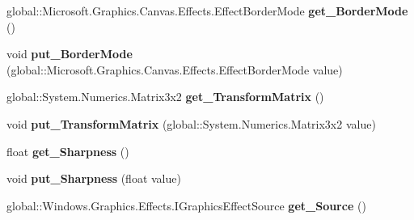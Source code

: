 \begin{DoxyCompactItemize}
global\+::\+Microsoft.\+Graphics.\+Canvas.\+Effects.\+Effect\+Border\+Mode {\bfseries get\+\_\+\+Border\+Mode} ()
\item 
\mbox{\label{interface_microsoft_1_1_graphics_1_1_canvas_1_1_effects_1_1_i_transform2_d_effect_a38434702873fe7cbe1f7303fd42c85de}} 
void {\bfseries put\+\_\+\+Border\+Mode} (global\+::\+Microsoft.\+Graphics.\+Canvas.\+Effects.\+Effect\+Border\+Mode value)
\item 
\mbox{\label{interface_microsoft_1_1_graphics_1_1_canvas_1_1_effects_1_1_i_transform2_d_effect_ac948729dfbfa255235037cd2b8a44715}} 
global\+::\+System.\+Numerics.\+Matrix3x2 {\bfseries get\+\_\+\+Transform\+Matrix} ()
\item 
\mbox{\label{interface_microsoft_1_1_graphics_1_1_canvas_1_1_effects_1_1_i_transform2_d_effect_a053a9b302520e44c813aa3355df1c959}} 
void {\bfseries put\+\_\+\+Transform\+Matrix} (global\+::\+System.\+Numerics.\+Matrix3x2 value)
\item 
\mbox{\label{interface_microsoft_1_1_graphics_1_1_canvas_1_1_effects_1_1_i_transform2_d_effect_a68ba1c90a21490b6ceaa03f39f1a1c01}} 
float {\bfseries get\+\_\+\+Sharpness} ()
\item 
\mbox{\label{interface_microsoft_1_1_graphics_1_1_canvas_1_1_effects_1_1_i_transform2_d_effect_aa2e12a86a9e8cf3335707e71b6601b29}} 
void {\bfseries put\+\_\+\+Sharpness} (float value)
\item 
\mbox{\label{interface_microsoft_1_1_graphics_1_1_canvas_1_1_effects_1_1_i_transform2_d_effect_a808f1b49b9663c0610d2495cf643268f}} 
global\+::\+Windows.\+Graphics.\+Effects.\+I\+Graphics\+Effect\+Source {\bfseries get\+\_\+\+Source} ()
\item 
\mbox{\label{interface_microsoft_1_1_graphics_1_1_canvas_1_1_effects_1_1_i_transform2_d_effect_ae417421258d1e16d1da95390cce154d5}} 

\end{DoxyCompactItemize}

